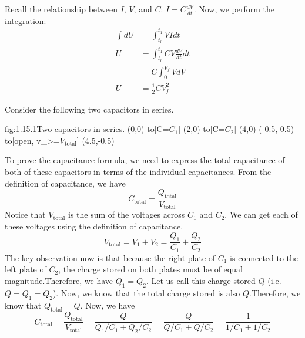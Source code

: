 Recall the relationship between $I$, $V$, and $C$: $I = C\frac{dV}{dt}$. Now, we perform the integration:
\begin{align*}
    \int dU &= \int_{t_0} ^{t_1} VIdt\\
    U &= \int_{t_0} ^{t_1} CV\frac{dV}{dt}dt\\
    &= C\int_0^{V_f} V dV\\
    U &= \frac{1}{2}CV_f^2
\end{align*}

Consider the following two capacitors in series.
\begin{circuit}{fig:1.15.1}{Two capacitors in series.}
    (0,0) to[C=$C_1$] (2,0)
        to[C=$C_2$] (4,0)
    (-0.5,-0.5) to[open, v_>=$V_\text{total}$] (4.5,-0.5)
\end{circuit}

To prove the capacitance formula, we need to express the total capacitance of both of these capacitors in terms of the individual capacitances. From the definition of capacitance, we have 
\[C_\text{total} = \frac{Q_\text{total}}{V_\text{total}}\]
Notice that $V_\text{total}$ is the sum of the voltages across $C_1$ and $C_2$. We can get each of these voltages using the definition of capacitance.
\[V_\text{total} = V_1 + V_2 = \frac{Q_1}{C_1} + \frac{Q_2}{C_2}\]
The key observation now is that because the right plate of $C_1$ is connected to the left plate of $C_2$, the charge stored on both plates must be of equal magnitude.\footnotemark Therefore, we have $Q_1 = Q_2$. Let us call this charge stored $Q$ (i.e. $Q = Q_1 = Q_2$). Now, we know that the total charge stored is also $Q$.\footnotemark Therefore, we know that $Q_\text{total} = Q$. Now, we have 
\[C_\text{total} = \frac{Q_\text{total}}{V_\text{total}} = \frac{Q}{Q_1/C_1 + Q_2/C_2} = \frac{Q}{Q/C_1 + Q/C_2} = \frac{1}{1/C_1 + 1/C_2}\]



